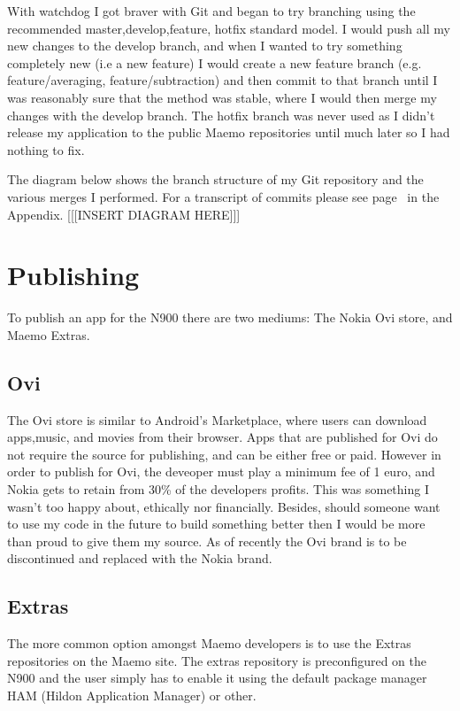 \documentclass[11pt]{article} %
\begin{document}
With watchdog I got braver with Git and began to try branching using the recommended master,develop,feature, hotfix standard model. I would push all my new changes to the develop branch, and when I wanted to try something completely new (i.e a new feature) I would create a new feature branch (e.g. feature/averaging, feature/subtraction) and then commit to that branch until I was reasonably sure that the method was stable, where I would then merge my changes with the develop branch. The hotfix branch was never used as I didn’t release my application to the public Maemo repositories until much later so I had nothing to fix.

The diagram below shows the branch structure of my Git repository and the various merges I performed. For a transcript of commits please see page~\pageref{commits} in the Appendix.
[[[INSERT DIAGRAM HERE]]]



\section{Publishing}
To publish an app for the N900 there are two mediums: The Nokia Ovi store, and Maemo Extras.

\subsection{Ovi}
The Ovi store is similar to Android’s Marketplace, where users can download apps,music, and movies from their browser. Apps that are published for Ovi do not require the source for publishing, and can be either free or paid. However in order to publish for Ovi, the deveoper must play a minimum fee of 1 euro, and Nokia gets to retain from 30\% of the developers profits. This was something I wasn’t too happy about, ethically nor financially. Besides, should someone want to use my code in the future to build something better then I would be more than proud to give them my source. As of recently the Ovi brand is to be discontinued and replaced with the Nokia brand.

\subsection{Extras}
The more common option amongst Maemo developers is to use the Extras repositories on the Maemo site. The extras repository is preconfigured on the N900 and the user simply has to enable it using the default package manager HAM (Hildon Application Manager) or other.
\end{document}
